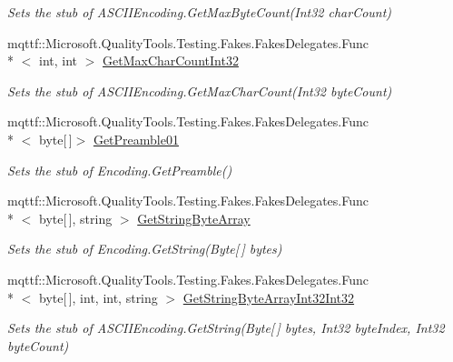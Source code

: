 \begin{DoxyCompactItemize}
\begin{DoxyCompactList}\small\item\em Sets the stub of A\-S\-C\-I\-I\-Encoding.\-Get\-Max\-Byte\-Count(\-Int32 char\-Count)\end{DoxyCompactList}\item 
mqttf\-::\-Microsoft.\-Quality\-Tools.\-Testing.\-Fakes.\-Fakes\-Delegates.\-Func\\*
$<$ int, int $>$ \hyperlink{class_system_1_1_text_1_1_fakes_1_1_stub_a_s_c_i_i_encoding_a904c62f592319e264f5c4b40ce0aa736}{Get\-Max\-Char\-Count\-Int32}
\begin{DoxyCompactList}\small\item\em Sets the stub of A\-S\-C\-I\-I\-Encoding.\-Get\-Max\-Char\-Count(\-Int32 byte\-Count)\end{DoxyCompactList}\item 
mqttf\-::\-Microsoft.\-Quality\-Tools.\-Testing.\-Fakes.\-Fakes\-Delegates.\-Func\\*
$<$ byte\mbox{[}$\,$\mbox{]}$>$ \hyperlink{class_system_1_1_text_1_1_fakes_1_1_stub_a_s_c_i_i_encoding_a1867f9b1c9db5ea0e88bf2cefe1bba09}{Get\-Preamble01}
\begin{DoxyCompactList}\small\item\em Sets the stub of Encoding.\-Get\-Preamble()\end{DoxyCompactList}\item 
mqttf\-::\-Microsoft.\-Quality\-Tools.\-Testing.\-Fakes.\-Fakes\-Delegates.\-Func\\*
$<$ byte\mbox{[}$\,$\mbox{]}, string $>$ \hyperlink{class_system_1_1_text_1_1_fakes_1_1_stub_a_s_c_i_i_encoding_aee27dcbc8cd6316ca6c06973731dd630}{Get\-String\-Byte\-Array}
\begin{DoxyCompactList}\small\item\em Sets the stub of Encoding.\-Get\-String(\-Byte\mbox{[}$\,$\mbox{]} bytes)\end{DoxyCompactList}\item 
mqttf\-::\-Microsoft.\-Quality\-Tools.\-Testing.\-Fakes.\-Fakes\-Delegates.\-Func\\*
$<$ byte\mbox{[}$\,$\mbox{]}, int, int, string $>$ \hyperlink{class_system_1_1_text_1_1_fakes_1_1_stub_a_s_c_i_i_encoding_a53b4a15752203a159c1ee3ea15066600}{Get\-String\-Byte\-Array\-Int32\-Int32}
\begin{DoxyCompactList}\small\item\em Sets the stub of A\-S\-C\-I\-I\-Encoding.\-Get\-String(\-Byte\mbox{[}$\,$\mbox{]} bytes, Int32 byte\-Index, Int32 byte\-Count)\end{DoxyCompactList}\item 

\end{DoxyCompactItemize}
